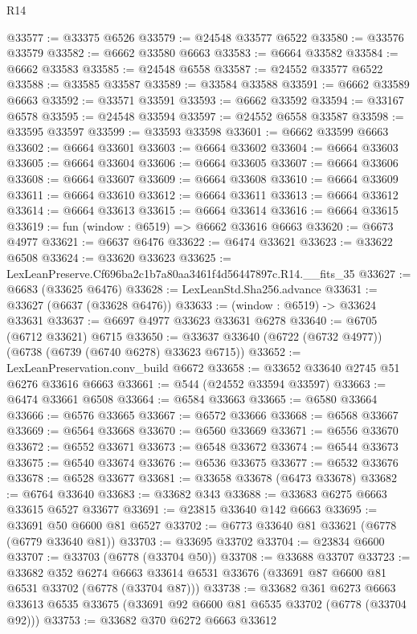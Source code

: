 \begin{lexlean}{R14}
\begin{coremodule}
@33577 := @33375 @6526
@33579 := @24548 @33577 @6522
@33580 := @33576 @33579
@33582 := @6662 @33580 @6663
@33583 := @6664 @33582
@33584 := @6662 @33583
@33585 := @24548 @6558
@33587 := @24552 @33577 @6522
@33588 := @33585 @33587
@33589 := @33584 @33588
@33591 := @6662 @33589 @6663
@33592 := @33571 @33591
@33593 := @6662 @33592
@33594 := @33167 @6578
@33595 := @24548 @33594
@33597 := @24552 @6558 @33587
@33598 := @33595 @33597
@33599 := @33593 @33598
@33601 := @6662 @33599 @6663
@33602 := @6664 @33601
@33603 := @6664 @33602
@33604 := @6664 @33603
@33605 := @6664 @33604
@33606 := @6664 @33605
@33607 := @6664 @33606
@33608 := @6664 @33607
@33609 := @6664 @33608
@33610 := @6664 @33609
@33611 := @6664 @33610
@33612 := @6664 @33611
@33613 := @6664 @33612
@33614 := @6664 @33613
@33615 := @6664 @33614
@33616 := @6664 @33615
@33619 := fun (window : @6519) => @6662 @33616 @6663
@33620 := @6673 @4977
@33621 := @6637 @6476
@33622 := @6474 @33621
@33623 := @33622 @6508
@33624 := @33620 @33623
@33625 := LexLeanPreserve.Cf696ba2c1b7a80aa3461f4d56447897c.R14.__fits_35
@33627 := @6683 (@33625 @6476)
@33628 := LexLeanStd.Sha256.advance
@33631 := @33627 (@6637 (@33628 @6476))
@33633 := (window : @6519) -> @33624 @33631
@33637 := @6697 @4977 @33623 @33631 @6278
@33640 := @6705 (@6712 @33621) @6715
@33650 := @33637 @33640 (@6722 (@6732 @4977)) (@6738 (@6739 (@6740 @6278) @33623 @6715))
@33652 := LexLeanPreservation.conv_build @6672
@33658 := @33652 @33640 @2745 @51 @6276 @33616 @6663
@33661 := @544 (@24552 @33594 @33597)
@33663 := @6474 @33661 @6508
@33664 := @6584 @33663
@33665 := @6580 @33664
@33666 := @6576 @33665
@33667 := @6572 @33666
@33668 := @6568 @33667
@33669 := @6564 @33668
@33670 := @6560 @33669
@33671 := @6556 @33670
@33672 := @6552 @33671
@33673 := @6548 @33672
@33674 := @6544 @33673
@33675 := @6540 @33674
@33676 := @6536 @33675
@33677 := @6532 @33676
@33678 := @6528 @33677
@33681 := @33658 @33678 (@6473 @33678)
@33682 := @6764 @33640
@33683 := @33682 @343
@33688 := @33683 @6275 @6663 @33615 @6527 @33677
@33691 := @23815 @33640 @142 @6663
@33695 := @33691 @50 @6600 @81 @6527
@33702 := @6773 @33640 @81 @33621 (@6778 (@6779 @33640 @81))
@33703 := @33695 @33702
@33704 := @23834 @6600
@33707 := @33703 (@6778 (@33704 @50))
@33708 := @33688 @33707
@33723 := @33682
    @352
    @6274
    @6663
    @33614
    @6531
    @33676
    (@33691 @87 @6600 @81 @6531 @33702 (@6778 (@33704 @87)))
@33738 := @33682
    @361
    @6273
    @6663
    @33613
    @6535
    @33675
    (@33691 @92 @6600 @81 @6535 @33702 (@6778 (@33704 @92)))
@33753 := @33682
    @370
    @6272
    @6663
    @33612

\end{coremodule}
\end{lexlean}
